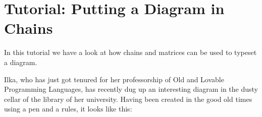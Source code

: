 %
%
%


\section{Tutorial: Putting a Diagram in Chains}

In this tutorial we have a look at how chains and matrices can be used
to typeset a diagram.

Ilka, who has just got tenured for her professorship of Old and
Lovable Programming Languages, has recently dug up an interesting
diagram in the dusty cellar of the library of her university. Having
been created in the good old times using a pen and a rules, it looks
like this:


